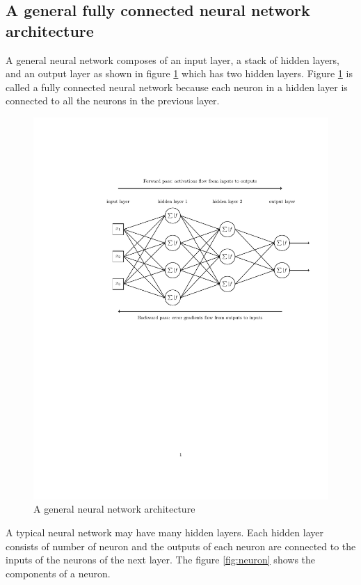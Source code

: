 \documentclass{article}
\begin{document}
\subsection{A general fully connected neural network architecture } \label{FCNN}
A general neural network composes of an input layer, a stack of hidden layers, and an output layer as shown in figure \ref{fig:NN} which has two hidden layers. Figure \ref{fig:NN} is called a fully connected neural network because each neuron in a hidden layer is connected to all the neurons in the previous layer.
\begin{figure}[h]
	\includegraphics[width=.75\textwidth]{NN.pdf}
	\caption{A general neural network architecture}
	\label{fig:NN}
\end{figure}
A typical neural network may have many hidden layers. Each hidden layer consists of number of neuron and the outputs of each neuron are connected to the inputs of the neurons of the next layer.
The figure \ref{fig:neuron} shows the components of a neuron. 
\end{document}
